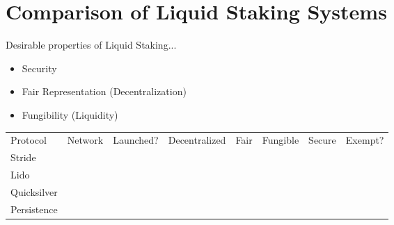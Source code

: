 \section{Comparison of Liquid Staking Systems}
Desirable properties of Liquid Staking...

\begin{itemize}
    \item Security
    \item Fair Representation (Decentralization)
    \item Fungibility (Liquidity)
\end{itemize}

\begin{table}[]
  \begin{tabular}{llllllll}
  Protocol          & Network & Launched? & Decentralized & Fair & Fungible & Secure & Exempt? \\
  Stride            &         &           &               &      &          &        &         \\
  Lido              &         &           &               &      &          &        &         \\
  Quicksilver       &         &           &               &      &          &        &         \\
  Persistence       &         &           &               &      &          &        &        
  \end{tabular}
\end{table}